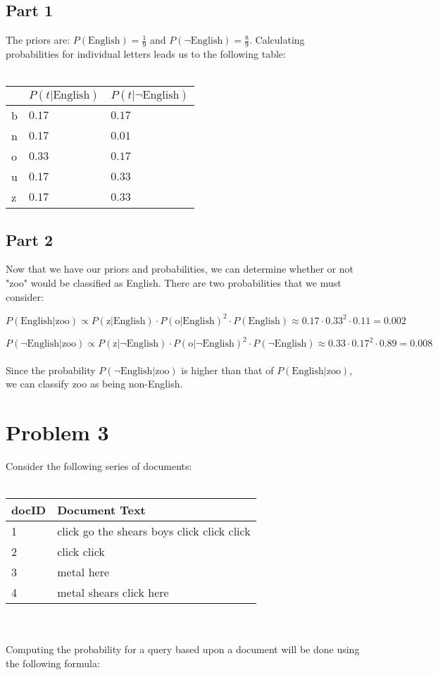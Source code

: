 \documentclass{article}%
\begin{document}
\subsection*{Part 1}
The priors are: $P(\text{English}) = \frac{1}{9}$ and $P(\neg{\text{English}}) = \frac{8}{9}$.
Calculating probabilities for individual letters leads us to the following table:\\
\\
\begin{tabular}{| l | l | l |}
    \hline
        & $P(t | \text{English})$   & $P(t | \neg{\text{English}})$ \\ \hline
    b   & $0.17$             & $0.17$ \\ \hline
    n   & $0.17$             & $0.01$ \\ \hline
    o   & $0.33$             & $0.17$ \\ \hline
    u   & $0.17$             & $0.33$ \\ \hline
    z   & $0.17$             & $0.33$ \\ \hline
\end{tabular}
\subsection*{Part 2}
Now that we have our priors and probabilities, we can determine whether or not "zoo" would be classified as English. There are
two probabilities that we must consider:

$P(\text{English} | \text{zoo}) \propto
P(\text{z} | \text{English}) \cdot P(\text{o} | \text{English})^2 \cdot P(\text{English})
\approx 0.17 \cdot 0.33^2 \cdot 0.11
= 0.002
$

$P(\neg\text{English} | \text{zoo}) \propto
P(\text{z} | \neg\text{English}) \cdot P(\text{o} | \neg\text{English})^2 \cdot P(\neg\text{English})
\approx 0.33 \cdot 0.17^2 \cdot 0.89
= 0.008$\\
\\
Since the probability $P(\neg\text{English} | \text{zoo})$ is higher than that of $P(\text{English} | \text{zoo})$, we can classify
zoo as being non-English.
\section*{Problem 3}
Consider the following series of documents:\\
\\
\begin{tabular}{l | l}
    docID & Document Text \\ \hline
    1 & click go the shears boys click click click \\ \hline
    2 & click click \\ \hline
    3 & metal here \\ \hline
    4 & metal shears click here \\ \hline
\end{tabular}\\
\vspace{5mm}\\
Computing the probability for a query based upon a document will be done using the following formula:
\end{document}
